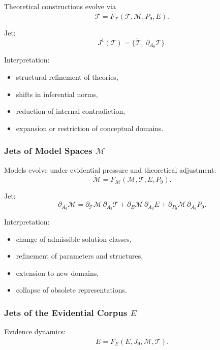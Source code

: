 Theoretical constructions evolve via
\[
\dot{\mathcal{T}}=F_{\mathcal{T}}(\mathcal{T},\mathcal{M},P_9,E).
\]

Jet:
\[
J^1(\mathcal{T})
=
\{\dot{\mathcal{T}},\ \partial_{A_9}\mathcal{T}\}.
\]

Interpretation:
\begin{itemize}
    \item structural refinement of theories,
    \item shifts in inferential norms,
    \item reduction of internal contradiction,
    \item expansion or restriction of conceptual domains.
\end{itemize}


\subsubsection{Jets of Model Spaces $\mathcal{M}$}

Models evolve under evidential pressure and theoretical adjustment:
\[
\dot{\mathcal{M}}=
F_{\mathcal{M}}(\mathcal{M},\mathcal{T},E,P_9).
\]

Jet:
\[
\partial_{A_9}\mathcal{M}
=
\partial_{\mathcal{T}}\mathcal{M}\,\partial_{A_9}\mathcal{T}
+
\partial_{E}\mathcal{M}\,\partial_{A_9}E
+
\partial_{P_9}\mathcal{M}\,\partial_{A_9}P_9.
\]

Interpretation:
\begin{itemize}
    \item change of admissible solution classes,
    \item refinement of parameters and structures,
    \item extension to new domains,
    \item collapse of obsolete representations.
\end{itemize}


\subsubsection{Jets of the Evidential Corpus \texorpdfstring{$E$}{E}}

Evidence dynamics:
\[
\dot{E}=F_E(E,J_9,\mathcal{M},\mathcal{T}).
\]

